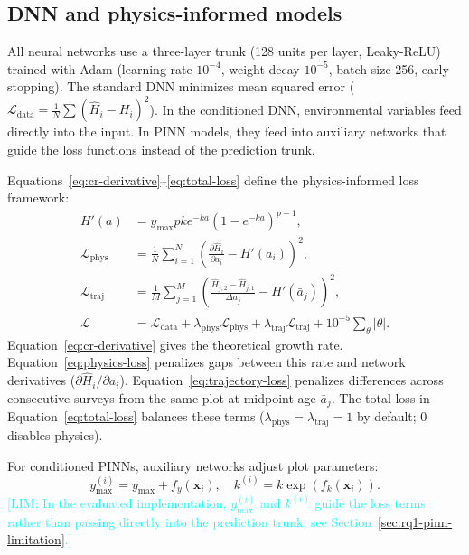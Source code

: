 \documentclass[logo,msc,ai]{infthesis}           %
\newcommand{\limit}[1]{\textcolor{cyan}{[LIM: #1]}}
\begin{document}
\subsection{DNN and physics-informed models}
All neural networks use a three-layer trunk (128 units per layer, Leaky-ReLU) trained with Adam (learning rate $10^{-4}$, weight decay $10^{-5}$, batch size 256, early stopping). The standard DNN minimizes mean squared error ($\mathcal{L}_{\mathrm{data}} = \frac{1}{N}\sum (\hat H_i-H_i)^2$). In the conditioned DNN, environmental variables feed directly into the input. In PINN models, they feed into auxiliary networks that guide the loss functions instead of the prediction trunk.

Equations~\eqref{eq:cr-derivative}--\eqref{eq:total-loss} define the physics-informed loss framework:
\begin{align}
H'(a) &= y_{\max}pk e^{-ka}\left(1-e^{-ka}\right)^{p-1}, \label{eq:cr-derivative} \\
\mathcal{L}_{\mathrm{phys}} &= \frac{1}{N}\sum_{i=1}^{N}\left(\frac{\partial\hat H_i}{\partial a_i}-H'(a_i)\right)^2, \label{eq:physics-loss} \\
\mathcal{L}_{\mathrm{traj}} &= \frac{1}{M}\sum_{j=1}^{M}\left(\frac{\hat H_{j,2}-\hat H_{j,1}}{\Delta a_j}-H'(\bar a_j)\right)^2, \label{eq:trajectory-loss} \\
\mathcal{L} &= \mathcal{L}_{\mathrm{data}} + \lambda_{\mathrm{phys}}\mathcal{L}_{\mathrm{phys}} + \lambda_{\mathrm{traj}}\mathcal{L}_{\mathrm{traj}} + 10^{-5}\sum_{\theta}|\theta|. \label{eq:total-loss}
\end{align}
Equation~\eqref{eq:cr-derivative} gives the theoretical growth rate. Equation~\eqref{eq:physics-loss} penalizes gaps between this rate and network derivatives ($\partial\hat H_i/\partial a_i$). Equation~\eqref{eq:trajectory-loss} penalizes differences across consecutive surveys from the same plot at midpoint age $\bar a_j$. The total loss in Equation~\eqref{eq:total-loss} balances these terms ($\lambda_{\mathrm{phys}}=\lambda_{\mathrm{traj}}=1$ by default; 0 disables physics). 

For conditioned PINNs, auxiliary networks adjust plot parameters:
\begin{equation}
y_{\max}^{(i)} = y_{\max}+f_y(\mathbf{x}_i), \quad k^{(i)} = k\exp\!\left(f_k(\mathbf{x}_i)\right).
\label{eq:param-adjust}
\end{equation}
\limit{In the evaluated implementation, $y_{\max}^{(i)}$ and $k^{(i)}$ guide the loss terms rather than passing directly into the prediction trunk; see Section~\ref{sec:rq1-pinn-limitation}.}
\end{document}
